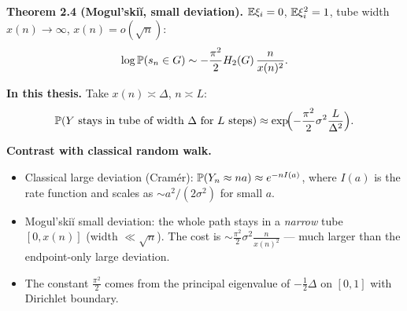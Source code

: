 \small
\textbf{Theorem 2.4 (Mogul'ski\u{i}, small deviation).}
$\E\xi_i=0$, $\E\xi_i^2=1$, tube width $x(n)\to\infty$, $x(n)=o(\sqrt n)$:
\[
    \log\P(s_n\in G)\sim -\frac{\pi^2}{2}H_2(G)\,\frac{n}{x(n)^2}.
\]

\medskip
\textbf{In this thesis.} Take $x(n)\asymp\Delta$, $n\asymp L$:
\[
    \P(Y\text{ stays in tube of width }\Delta\text{ for }L\text{ steps})
    \approx \exp\!\Bigl(-\frac{\pi^2}{2}\sigma^2\frac{L}{\Delta^2}\Bigr).
\]

\medskip
{\footnotesize\color{red!70!black}\textbf{Contrast with classical random walk.}}
{\footnotesize
\begin{itemize}
    \item Classical large deviation (Cram\'er): $\P(Y_n\approx na)\approx e^{-nI(a)}$, where $I(a)$ is the rate function and scales as $\sim a^2/(2\sigma^2)$ for small $a$.
    \item Mogul'ski\u{i} small deviation: the whole path stays in a \emph{narrow} tube $[0,x(n)]$ (width $\ll\sqrt n$). The cost is $\sim \frac{\pi^2}{2}\sigma^2\frac{n}{x(n)^2}$ --- much larger than the endpoint-only large deviation.
    \item The constant $\frac{\pi^2}{2}$ comes from the principal eigenvalue of $-\frac12\Delta$ on $[0,1]$ with Dirichlet boundary.
\end{itemize}
}
